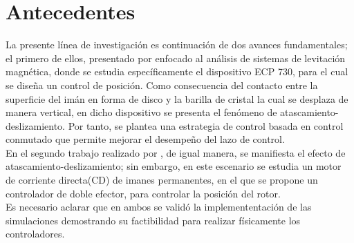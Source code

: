 \chapter{Antecedentes}\label{Chap:Antecedentes}
La presente línea de investigación es continuación de dos avances fundamentales; el primero de ellos, presentado por \cite{alcantara} enfocado al análisis de sistemas de levitación magnética,
donde se estudia específicamente el dispositivo ECP 730, para el cual se diseña un control de posición.
Como consecuencia del contacto entre la superficie del imán en forma de disco y la barilla de cristal la cual se desplaza de manera vertical, en dicho dispositivo se presenta el fenómeno de atascamiento-deslizamiento.
Por tanto, se plantea una estrategia de control basada en control conmutado que permite mejorar el desempeño del lazo de control.\\
En el segundo trabajo realizado por \cite{perez}, de igual manera, se manifiesta el efecto de atascamiento-deslizamiento;
sin embargo, en este escenario se estudia un motor de corriente directa(CD) de imanes permanentes, en el que se propone un controlador de doble efector, para controlar la posición del rotor.\\
Es necesario aclarar que en ambos se validó la implemententación de las simulaciones demostrando su factibilidad para realizar físicamente los controladores. 